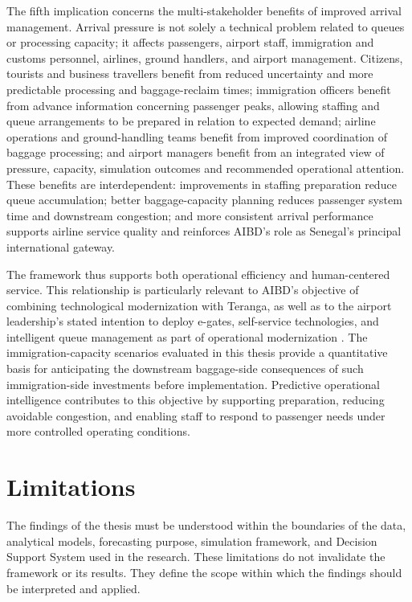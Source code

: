 The fifth implication concerns the multi-stakeholder benefits of improved arrival management. Arrival pressure is not solely a technical problem related to queues or processing capacity; it affects passengers, airport staff, immigration and customs personnel, airlines, ground handlers, and airport management. Citizens, tourists and business travellers benefit from reduced uncertainty and more predictable processing and baggage-reclaim times; immigration officers benefit from advance information concerning passenger peaks, allowing staffing and queue arrangements to be prepared in relation to expected demand; airline operations and ground-handling teams benefit from improved coordination of baggage processing; and airport managers benefit from an integrated view of pressure, capacity, simulation outcomes and recommended operational attention. These benefits are interdependent: improvements in staffing preparation reduce queue accumulation; better baggage-capacity planning reduces passenger system time and downstream congestion; and more consistent arrival performance supports airline service quality and reinforces AIBD’s role as Senegal’s principal international gateway.

The framework thus supports both operational efficiency and human-centered service. This relationship is particularly relevant to AIBD’s objective of combining technological modernization with Teranga, as well as to the airport leadership’s stated intention to deploy e-gates, self-service technologies, and intelligent queue management as part of operational modernization \parencite{demir2025speaker}. The immigration-capacity scenarios evaluated in this thesis provide a quantitative basis for anticipating the downstream baggage-side consequences of such immigration-side investments before implementation. Predictive operational intelligence contributes to this objective by supporting preparation, reducing avoidable congestion, and enabling staff to respond to passenger needs under more controlled operating conditions.

\section{Limitations}
\label{sec:conclusion-limitations}

The findings of the thesis must be understood within the boundaries of the data, analytical models, forecasting purpose, simulation framework, and Decision Support System used in the research. These limitations do not invalidate the framework or its results. They define the scope within which the findings should be interpreted and applied.

